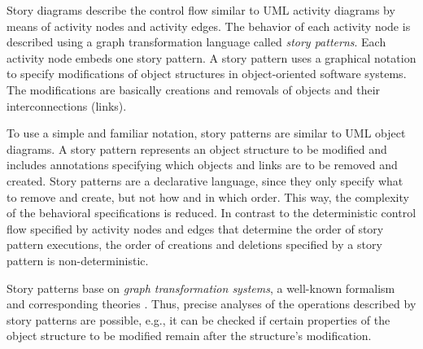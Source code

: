 Story diagrams describe the control flow similar to UML activity diagrams by means of activity nodes and activity edges.
The behavior of each activity node is described using a graph transformation language called \emph{story patterns}.
Each activity node embeds one story pattern.
A story pattern uses a graphical notation to specify modifications of object structures in object-oriented software systems.
The modifications are basically creations and removals of objects and their interconnections (links).


To use a simple and familiar notation, story patterns are similar to UML object diagrams.
A story pattern represents an object structure to be modified and includes annotations specifying which objects and links are to be removed and created.
Story patterns are a declarative language, since they only specify what to remove and create, but not how and in which order.
This way, the complexity of the behavioral specifications is reduced.
In contrast to the deterministic control flow specified by activity nodes and edges that determine the order of story pattern executions,
the order of creations and deletions specified by a story pattern is non-deterministic.


Story patterns base on \emph{graph transformation systems}, a well-known formalism and corresponding theories \cite{Roz97}.
Thus, precise analyses of the operations described by story patterns are possible,
e.g., it can be checked if certain properties of the object structure to be modified remain after the structure's modification.


